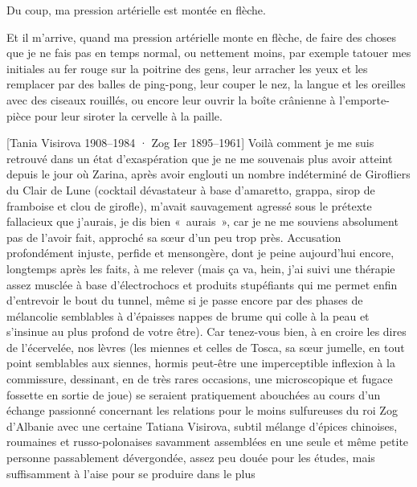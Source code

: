 Du coup, ma pression artérielle est montée en flèche.

Et il m’arrive, quand ma pression artérielle monte en flèche, de faire des choses que je ne fais pas en temps normal, ou nettement moins, par exemple tatouer mes initiales au fer rouge sur la poitrine des gens, leur arracher les yeux et les remplacer par des balles de ping-pong, leur couper le nez, la langue et les oreilles avec des ciseaux rouillés, ou encore leur ouvrir la boîte crânienne à l’emporte-pièce pour leur siroter la cervelle à la paille.

%
%
[Tania Visirova \textup{1908--1984} · Zog Ier \textup{1895--1961}]%
Voilà comment je me suis retrouvé dans un état d’exaspération que je ne me souvenais plus avoir atteint depuis le jour où Zarina, après avoir englouti un nombre indéterminé de Girofliers du Clair de Lune (cocktail dévastateur à base d’amaretto, grappa, sirop de framboise et clou de girofle), m’avait sauvagement agressé sous le prétexte fallacieux que j’aurais, je dis bien «~aurais~», car je ne me souviens absolument pas de l’avoir fait, approché sa sœur d’un peu trop près. Accusation profondément injuste, perfide et mensongère, dont je peine aujourd’hui encore, longtemps après les faits, à me relever (mais ça va, hein, j’ai suivi une thérapie assez musclée à base d’électrochocs et produits stupéfiants qui me permet enfin d’entrevoir le bout du tunnel, même si je passe encore par des phases de mélancolie semblables à d’épaisses nappes de brume qui colle à la peau et s’insinue au plus profond de votre être). Car tenez-vous bien, à en croire les dires de l’écervelée, nos lèvres (les miennes et celles de Tosca, sa sœur jumelle, en tout point semblables aux siennes, hormis peut-être une imperceptible inflexion à la commissure, dessinant, en de très rares occasions, une microscopique et fugace fossette en sortie de joue) se seraient pratiquement abouchées au cours d’un échange passionné concernant les relations pour le moins sulfureuses du roi Zog d’Albanie avec une certaine Tatiana Visirova, subtil mélange d’épices chinoises, roumaines et russo-polonaises savamment assemblées en une seule et même petite personne passablement dévergondée, assez peu douée pour les études, mais suffisamment à l’aise pour se produire dans le plus 